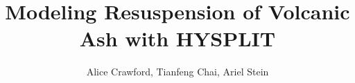 \documentclass[12pt]{article}
\title{Modeling Resuspension of Volcanic Ash with HYSPLIT}
\author{Alice Crawford, Tianfeng Chai, Ariel Stein}
\begin{document}
\newcommand{\mr}{\mathrm}
\newcommand{\mgv}{\frac{\mathrm{mg}}{\mathrm{m}^3}}
\newcommand{\kgm}{$\mathrm{kg}/\mathrm{m}^3$}
\newcommand{\vaftad}{VATD model}
\newcommand{\fwa}{60 mm}
\newcommand{\fwc}{50 mm}
\newcommand{\fwb}{100 mm}
\newcommand{\um}{\mu\mathrm{m}}
\newcommand{\ugmc}{\mu\mathrm{g}\mathrm{m}^{-3}}
\newcommand{\gmc}{\mathrm{g}\mathrm{m}^{-3}}
\newcommand{\lidar}{LIDAR}
\newcommand{\gms}{\frac{\mathrm{g}}{\mathrm{m}^2}}
\newcommand{\fig}{Fig.}
\newcommand{\tabl}{Table}
\newcommand{\mumc}{$\mu \mathrm{gm}^{-3}$}
\newcommand{\PMten}{PM$_10$ \hspace{5pt}}
\newcommand{\cthresh}{C$_{\mathrm{t}$}}
\newcommand{\ustart}{$u_{*t}$}
\newcommand{\ustar}{$u_{*}$}
\newcommand{\mustart}{u_{*t}}
\newcommand{\mustar}{u_{*}}
\newcommand{\eyja}{Eyjafjallojokull}
\newcommand{\gcm}{\mathrm{g}\;\mathrm{cm}^{-2}}
\newcommand{\gconc}{\mathrm{g}\;\mathrm{cm}^{3}}
\newcommand{\ugcm}{\mu\mathrm{g}\;\mathrm{cm}^{-3}}
\newcommand{\pmten}{$\mathrm{PM}_{10}$ \hspace{5pt}}
\newcommand{\spms}{suspended particulate monthly summary }
\newcommand{\spmsn}{suspended particulate monthly summary}
\newcommand{\spmss}{suspended particulate monthly summaries }






\clearpage
{}

\end{document}
